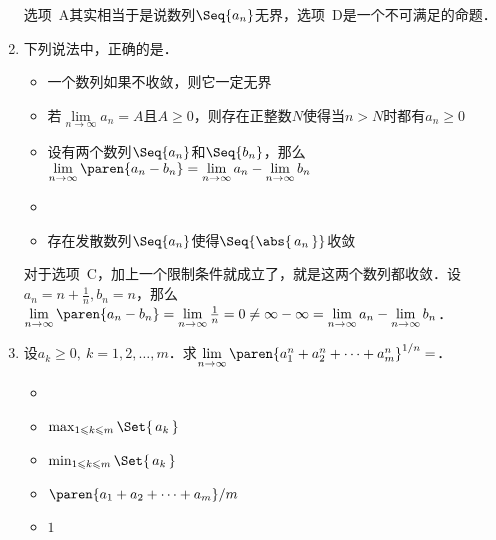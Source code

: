 \begin{enumerate}
  \ifshowsol
    选项~A其实相当于是说数列\(\Seq{a_n}\)无界，选项~D是一个不可满足的命题．
  \fi

\item 下列说法中，正确的是\uline{\makebox[10em]{}}．
  \begin{itemize}
    \renewcommand{\labelitemi}{\faCircleThin}
  \item 一个数列如果不收敛，则它一定无界
  \item 若\(\lim\limits_{n\to\infty} a_n = A\)且\(A \ge 0\)，则存在正整数\(N\)使得当\(n > N\)时都有\(a_n \ge 0\)
  \item 设有两个数列\(\Seq{a_n}\)和\(\Seq{b_n}\)，那么\(\lim\limits_{n\to\infty} \paren{a_n - b_n} = \lim\limits_{n\to\infty} a_n - \lim\limits_{n\to\infty} b_n\)
    \ifshowsol
    \item[\faCircle]
    \else
    \item
    \fi
    存在发散数列\(\Seq{a_n}\)使得\(\Seq{\abs{\,a_n\,}}\)收敛
  \end{itemize}

  \ifshowsol
    对于选项~C，加上一个限制条件就成立了，就是这两个数列都收敛．设\(a_n = n + \frac1n, b_n = n\)，那么\(\lim\limits_{n\to\infty} \paren{a_n - b_n} = \lim\limits_{n\to\infty} \frac1n = 0 \ne \infty - \infty = \lim\limits_{n\to\infty} a_n - \lim\limits_{n\to\infty} b_n\)．
  \fi

\item 设\(a_k \ge 0,\ k = 1, 2, \dots, m\)．求\(\lim\limits_{n\to\infty} \paren{a_1^n + a_2^n + \dots + a_m^n}^{1/n} =\)\uline{\makebox[6em]{}}．
  \begin{itemize}
    \renewcommand{\labelitemi}{\faCircleThin}
    \ifshowsol
    \item[\faCircle]
    \else
    \item
    \fi
    \(\max_{1 \le k \le m} \Set{\,a_k\,}\)
  \item \(\min_{1 \le k \le m} \Set{\,a_k\,}\)
  \item \(\paren{a_1 + a_2 + \dots + a_m}/{m}\) %
  \item \(1\)
  \end{itemize}


\end{enumerate}
